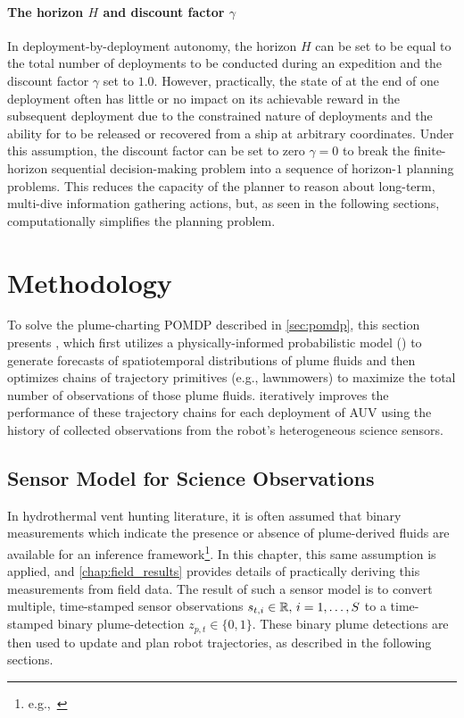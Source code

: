 \paragraph{The horizon $H$ and discount factor $\gamma$} In deployment-by-deployment autonomy, the horizon $H$ can be set to be equal to the total number of deployments to be conducted during an expedition and the discount factor $\gamma$ set to $1.0$. However, practically, the state of \Sentry at the end of one deployment often has little or no impact on its achievable reward in the subsequent deployment due to the constrained nature of deployments and the ability for \Sentry to be released or recovered from a ship at arbitrary coordinates. Under this assumption, the discount factor can be set to zero $\gamma=0$ to break the finite-horizon sequential decision-making problem into a sequence of horizon-$1$ planning problems. This reduces the capacity of the planner to reason about long-term, multi-dive information gathering actions, but, as seen in the following sections, computationally simplifies the planning problem.



\section{Methodology}
\label{sec:methods}
To solve the plume-charting POMDP described in \cref{sec:pomdp}, this section presents \PHORTEX, which first utilizes a physically-informed probabilistic model (\PHUMES) to generate forecasts of spatiotemporal distributions of plume fluids and then optimizes chains of trajectory primitives (e.g., lawnmowers) to maximize the total number of observations of those plume fluids. \PHORTEX iteratively improves the performance of these trajectory chains for each deployment of AUV \Sentry using the history of collected observations from the robot's heterogeneous science sensors.


\subsection{Sensor Model for Science Observations}
\label{sec:sensor_models}
In hydrothermal vent hunting literature, it is often assumed that binary measurements which indicate the presence or absence of plume-derived fluids are available for an inference framework\footnote{e.g.,~\cite{tian2014behavior,saigol2009information}}. In this chapter, this same assumption is applied, and \cref{chap:field_results} provides details of practically deriving this measurements from field data. The result of such a sensor model is to convert multiple, time-stamped sensor observations $s_{t, i} \in \mathbb{R}, \, i = 1, \dots, S$ to a time-stamped binary plume-detection $z_{p, t} \in \{0, 1\}$. These binary plume detections are then used to update \PHUMES and plan robot trajectories, as described in the following sections. 

